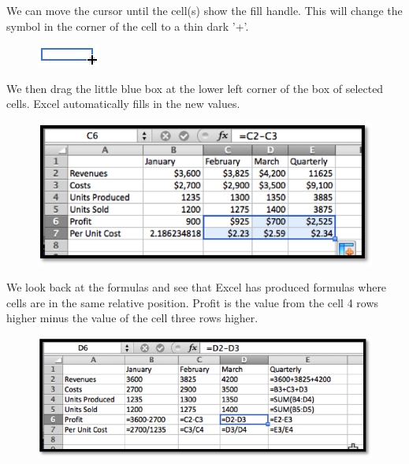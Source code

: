 \documentclass[10pt,]{book}
\theoremstyle{plain}
\theoremstyle{definition}
\theoremstyle{definition}
\begin{document}
We can move the cursor until the cell(s) show the fill handle. This will change the symbol in the corner of the cell to a thin dark '+'.%
\leavevmode%
\begin{figure}
\centering
\includegraphics[width=0.2\linewidth]{images/sec1-3-5.png}
\end{figure}
\par
 
We then drag the little blue box at the lower left corner of the box of selected cells.  Excel automatically fills in the new values.%
\leavevmode%
\begin{figure}
\centering
\includegraphics[width=0.8\linewidth]{images/sec1-3-6FebSums.png}
\end{figure}
\par

We look back at the formulas and see that Excel has produced formulas where cells are in the same relative position.  Profit is the value from the cell 4 rows higher minus the value of the cell three rows higher.%
\leavevmode%
\begin{figure}
\centering
\includegraphics[width=0.8\linewidth]{images/sec1-3-7MoreSums.png}
\end{figure}
\par
\end{document}

